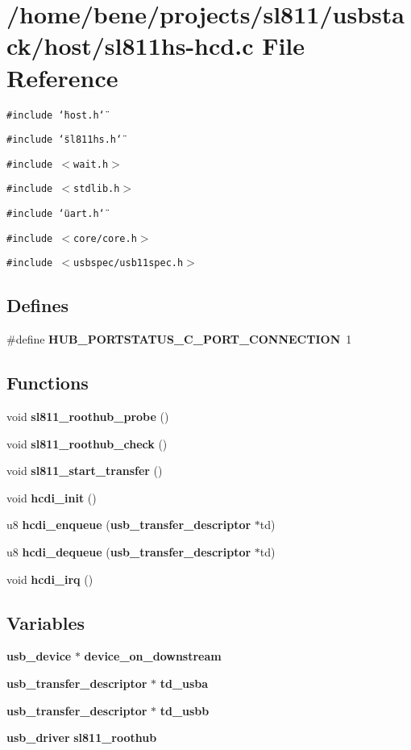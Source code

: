 \section{/home/bene/projects/sl811/usbstack/host/sl811hs-hcd.c File Reference}
\label{sl811hs-hcd_8c}
{\tt \#include \char`\"{}host.h\char`\"{}}\par
{\tt \#include \char`\"{}sl811hs.h\char`\"{}}\par
{\tt \#include $<$wait.h$>$}\par
{\tt \#include $<$stdlib.h$>$}\par
{\tt \#include \char`\"{}uart.h\char`\"{}}\par
{\tt \#include $<$core/core.h$>$}\par
{\tt \#include $<$usbspec/usb11spec.h$>$}\par
\subsection*{Defines}
\begin{CompactItemize}
\item 
\#define {\bf HUB\_\-PORTSTATUS\_\-C\_\-PORT\_\-CONNECTION}~1
\end{CompactItemize}
\subsection*{Functions}
\begin{CompactItemize}
\item 
void {\bf sl811\_\-roothub\_\-probe} ()
\item 
void {\bf sl811\_\-roothub\_\-check} ()
\item 
void {\bf sl811\_\-start\_\-transfer} ()
\item 
void {\bf hcdi\_\-init} ()
\item 
u8 {\bf hcdi\_\-enqueue} ({\bf usb\_\-transfer\_\-descriptor} $\ast$td)
\item 
u8 {\bf hcdi\_\-dequeue} ({\bf usb\_\-transfer\_\-descriptor} $\ast$td)
\item 
void {\bf hcdi\_\-irq} ()
\end{CompactItemize}
\subsection*{Variables}
\begin{CompactItemize}
\item 
{\bf usb\_\-device} $\ast$ {\bf device\_\-on\_\-downstream}
\item 
{\bf usb\_\-transfer\_\-descriptor} $\ast$ {\bf td\_\-usba}
\item 
{\bf usb\_\-transfer\_\-descriptor} $\ast$ {\bf td\_\-usbb}
\item 
{\bf usb\_\-driver} {\bf sl811\_\-roothub}
\end{CompactItemize}


